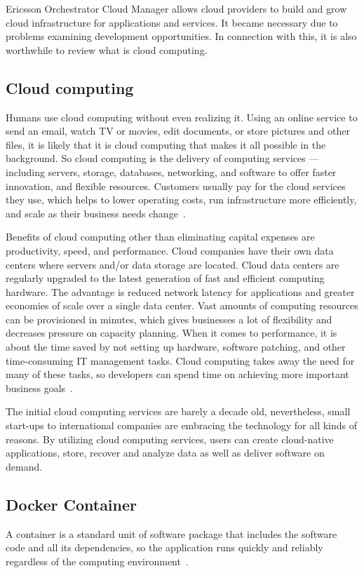 Ericsson Orchestrator Cloud Manager allows cloud providers to build and grow cloud infrastructure for applications and services. It became necessary due to problems examining development opportunities. In connection with this, it is also worthwhile to review what is cloud computing.

\subsection{Cloud computing}
Humans use cloud computing without even realizing it. Using an online service to send an email, watch TV or movies, edit documents, or store pictures and other files, it is likely that it is cloud computing that makes it all possible in the background. So cloud computing is the delivery of computing services — including servers, storage, databases, networking, and software to offer faster innovation, and flexible resources. Customers usually pay for the cloud services they use, which helps to lower operating costs, run infrastructure more efficiently, and scale as their business needs change~\cite{cloud-computing}.

Benefits of cloud computing other than eliminating capital expenses are productivity, speed, and performance. Cloud companies have their own data centers where servers and/or data storage are located. Cloud data centers are regularly upgraded to the latest generation of fast and efficient computing hardware. The advantage is reduced network latency for applications and greater economies of scale over a single data center. Vast amounts of computing resources can be provisioned in minutes, which gives businesses a lot of flexibility and decreases pressure on capacity planning. When it comes to performance, it is about the time saved by not setting up hardware, software patching, and other time-consuming IT management tasks. Cloud computing takes away the need for many of these tasks, so developers can spend time on achieving more important business goals~\cite{what-is-cloud-computing}.

The initial cloud computing services are barely a decade old, nevertheless, small start-ups to international companies are embracing the technology for all kinds of reasons. By utilizing cloud computing services, users can create cloud-native applications, store, recover and analyze data as well as deliver software on demand.

\subsection{Docker Container}
A container is a standard unit of software package that includes the software code and all its dependencies, so the application runs quickly and reliably regardless of the computing environment~\cite{docker-container}.

